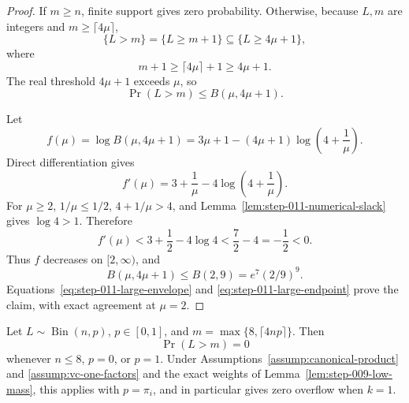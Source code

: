 \begin{proof}
If \(m\ge n\), finite support gives zero probability.  Otherwise, because
\(L,m\) are integers and \(m\ge\lceil4\mu\rceil\),
\begin{equation}\label{eq:step-011-large-event}
\{L>m\}=\{L\ge m+1\}
\subseteq\{L\ge4\mu+1\},
\end{equation}
where
\begin{equation}\label{eq:step-011-ceiling-successor}
m+1\ge\lceil4\mu\rceil+1\ge4\mu+1.
\end{equation}
The real threshold \(4\mu+1\) exceeds \(\mu\), so
\begin{equation}\label{eq:step-011-large-envelope}
\Pr(L>m)\le B(\mu,4\mu+1).
\end{equation}

Let
\begin{equation}\label{eq:step-011-log-envelope}
f(\mu)=\log B(\mu,4\mu+1)
=3\mu+1-(4\mu+1)\log\left(4+\frac1\mu\right).
\end{equation}
Direct differentiation gives
\begin{equation}\label{eq:step-011-large-derivative}
f'(\mu)=3+\frac1\mu
-4\log\left(4+\frac1\mu\right).
\end{equation}
For \(\mu\ge2\), \(1/\mu\le1/2\),
\(4+1/\mu>4\), and Lemma~\ref{lem:step-011-numerical-slack} gives
\(\log4>1\).  Therefore
\begin{equation}\label{eq:step-011-negative-derivative}
f'(\mu)<3+\frac12-4\log4
<\frac72-4=-\frac12<0.
\end{equation}
Thus \(f\) decreases on \([2,\infty)\), and
\begin{equation}\label{eq:step-011-large-endpoint}
B(\mu,4\mu+1)\le B(2,9)=e^7(2/9)^9.
\end{equation}
Equations~\eqref{eq:step-011-large-envelope} and
\eqref{eq:step-011-large-endpoint} prove the claim, with exact agreement
at \(\mu=2\).
\end{proof}

\begin{lemma}
\label{lem:step-011-zero-overflow}
Let \(L\sim\operatorname{Bin}(n,p)\), \(p\in[0,1]\), and
\(m=\max\{8,\lceil4np\rceil\}\).  Then
\begin{equation}\label{eq:step-011-zero-overflow}
\Pr(L>m)=0
\end{equation}
whenever \(n\le8\), \(p=0\), or \(p=1\).  Under
Assumptions~\ref{assump:canonical-product} and
\ref{assump:vc-one-factors} and the exact weights of
Lemma~\ref{lem:step-009-low-mass}, this applies with \(p=\pi_i\), and in
particular gives zero overflow when \(k=1\).
\end{lemma}

